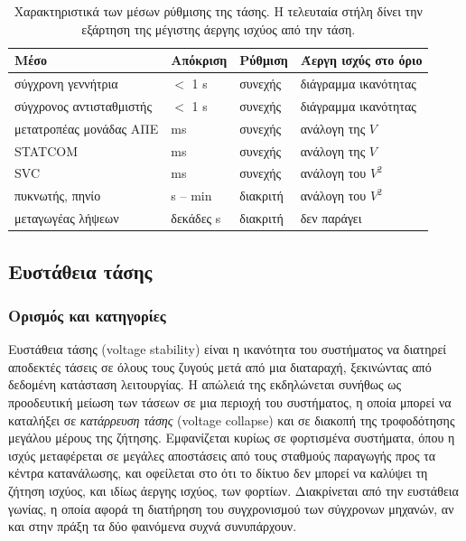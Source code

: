 \begin{table}[!htbp]
\centering
\begin{tabular}{llll}
\hline
Μέσο & Απόκριση & Ρύθμιση & Άεργη ισχύς στο όριο \\
\hline
σύγχρονη γεννήτρια & $<$ 1 s & συνεχής & διάγραμμα ικανότητας \\
σύγχρονος αντισταθμιστής & $<$ 1 s & συνεχής & διάγραμμα ικανότητας \\
μετατροπέας μονάδας ΑΠΕ & ms & συνεχής & ανάλογη της $V$ \\
STATCOM & ms & συνεχής & ανάλογη της $V$ \\
SVC & ms & συνεχής & ανάλογη του $V^2$ \\
πυκνωτής, πηνίο & s -- min & διακριτή & ανάλογη του $V^2$ \\
μεταγωγέας λήψεων & δεκάδες s & διακριτή & δεν παράγει \\
\hline
\end{tabular}
\caption{Χαρακτηριστικά των μέσων ρύθμισης της τάσης. Η τελευταία στήλη δίνει την εξάρτηση της
μέγιστης άεργης ισχύος από την τάση.}
\label{tab:v-means}
\end{table}

\subsection{Ευστάθεια τάσης}
\label{sec:v-stability}

\subsubsection{Ορισμός και κατηγορίες}

Ευστάθεια τάσης (voltage stability) είναι η ικανότητα του συστήματος να διατηρεί αποδεκτές
τάσεις σε όλους τους ζυγούς μετά από μια διαταραχή, ξεκινώντας από δεδομένη κατάσταση
λειτουργίας. Η απώλειά της εκδηλώνεται συνήθως ως προοδευτική μείωση των τάσεων σε μια περιοχή
του συστήματος, η οποία μπορεί να καταλήξει σε \emph{κατάρρευση τάσης} (voltage collapse) και
σε διακοπή της τροφοδότησης μεγάλου μέρους της ζήτησης. Εμφανίζεται κυρίως σε φορτισμένα
συστήματα, όπου η ισχύς μεταφέρεται σε μεγάλες αποστάσεις από τους σταθμούς παραγωγής προς τα
κέντρα κατανάλωσης, και οφείλεται στο ότι το δίκτυο δεν μπορεί να καλύψει τη ζήτηση ισχύος, και
ιδίως άεργης ισχύος, των φορτίων. Διακρίνεται από την ευστάθεια γωνίας, η οποία αφορά τη
διατήρηση του συγχρονισμού των σύγχρονων μηχανών, αν και στην πράξη τα δύο φαινόμενα συχνά
συνυπάρχουν.

